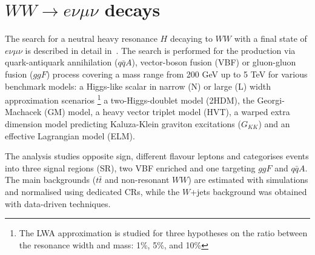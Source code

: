 \documentclass{PoS}
\begin{document}
\vspace*{-4mm}
\section{$WW\rightarrow e\nu \mu \nu$ decays}
\label{sec:WW}
\vspace*{-2mm}
The search for a neutral heavy resonance $H$ decaying to $WW$ with a final state of $e\nu \mu \nu$ is described in detail in~\cite{HIGG-2016-31}. 
The search is performed for the production via quark-antiquark annihilation ($q\bar{q}A$), vector-boson fusion (VBF) or gluon-gluon fusion ($ggF$) process covering a mass range from 200 GeV up to 5 TeV for various benchmark models: a Higgs-like scalar in narrow (N) or large (L) width approximation scenarios
\footnote{
The LWA approximation is studied for three hypotheses on the ratio between the resonance width and mass: 1\%, 5\%, and 10\%  }
a two-Higgs-doublet model (2HDM), the Georgi-Machacek (GM) model, a heavy vector triplet model (HVT), a warped extra dimension model predicting  Kaluza-Klein graviton excitations ($G_{KK}$) and an effective Lagrangian model (ELM).

The analysis studies opposite sign, different flavour leptons and categorises events into three signal regions (SR), two VBF enriched and one targeting $ggF$ and $q\bar{q}A$. 
The main backgrounds ($t\bar{t}$ and non-resonant $WW$) are estimated with simulations  and normalised using dedicated CRs, while the $W$+jets background was obtained with data-driven techniques. 
\end{document}
